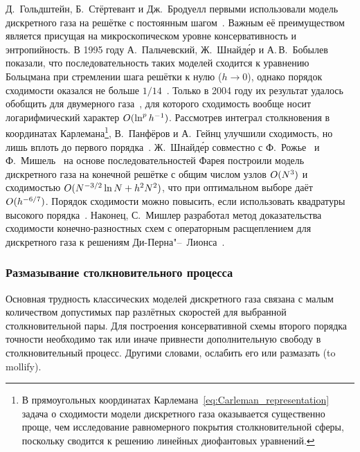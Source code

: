 Д.~Гольдштейн, Б.~Стёртевант и Дж.~Бродуелл первыми использовали модель дискретного газа
на решётке с постоянным шагом~\cite{Goldstein1989}.
Важным её преимуществом является присущая на микроскопическом уровне консервативность и энтропийность.
В 1995 году А.~Пальчевский, Ж.~Шнайд\'{е}р и А.\,В.~Бобылев показали,
что последовательность таких моделей сходится к уравнению Больцмана при стремлении шага решётки к нулю (\(h\to0\)),
однако порядок сходимости оказался не больше \(1/14\)~\cite{Palczewski1995, Palczewski1997}.
Только в 2004 году их результат удалось обобщить для двумерного газа~\cite{Fainsilber2006},
для которого сходимость вообще носит логарифмический характер \(O(\ln^p h^{-1})\).
Рассмотрев интеграл столкновения в координатах Карлемана\footnote{
    В прямоугольных координатах Карлемана~\eqref{eq:Carleman_representation} задача о сходимости
    модели дискретного газа оказывается существенно проще, чем исследование равномерного покрытия
    столкновительной сферы, поскольку сводится к решению линейных диофантовых уравнений.
}, В.~Панфёров и А.~Гейнц улучшили сходимость,
но лишь вплоть до первого порядка~\cite{Panferov2002}.
Ж.~Шнайд\'{е}р совместно с Ф.~Рожье~\cite{Rogier1994} и Ф.~Мишель~\cite{Michel2000}
на основе последовательностей Фарея построили модель дискретного газа на конечной решётке
с общим числом узлов \(O(N^3)\) и сходимостью \(O(N^{-3/2}\ln{N} + h^2N^2)\),
что при оптимальном выборе даёт \(O(h^{-6/7})\).
Порядок сходимости можно повысить, если использовать квадратуры высокого порядка~\cite{Brechtken2017}.
Наконец, С.~Мишлер разработал метод доказательства сходимости конечно-разностных схем
с операторным расщеплением для дискретного газа к решениям Ди-Перна"--~Лионса~\cite{Mischler1997}.

\subsubsection{Размазывание столкновительного процесса}

Основная трудность классических моделей дискретного газа связана с малым количеством
допустимых пар разлётных скоростей для выбранной столкновительной пары.
Для построения консервативной схемы второго порядка точности необходимо так или иначе
привнести дополнительную свободу в столкновительный процесс.
Другими словами, ослабить его или размазать (to mollify).

